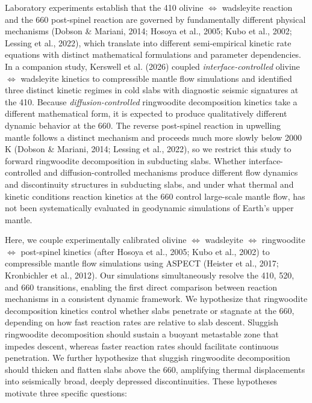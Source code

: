 \documentclass[draft,linenumbers]{agujournal2019}
\begin{document}
Laboratory experiments establish that the 410 olivine
\(\Leftrightarrow\) wadsleyite reaction and the 660 post-spinel reaction
are governed by fundamentally different physical mechanisms (Dobson \&
Mariani, 2014; Hosoya et al., 2005; Kubo et al., 2002; Lessing et al.,
2022), which translate into different semi-empirical kinetic rate
equations with distinct mathematical formulations and parameter
dependencies. In a companion study, Kerswell et al. (2026) coupled
\emph{interface-controlled} olivine \(\Leftrightarrow\) wadsleyite
kinetics to compressible mantle flow simulations and identified three
distinct kinetic regimes in cold slabs with diagnostic seismic
signatures at the 410. Because \emph{diffusion-controlled} ringwoodite
decomposition kinetics take a different mathematical form, it is
expected to produce qualitatively different dynamic behavior at the 660.
The reverse post-spinel reaction in upwelling mantle follows a distinct
mechanism and proceeds much more slowly below 2000 K (Dobson \& Mariani,
2014; Lessing et al., 2022), so we restrict this study to forward
ringwoodite decomposition in subducting slabs. Whether
interface-controlled and diffusion-controlled mechanisms produce
different flow dynamics and discontinuity structures in subducting
slabs, and under what thermal and kinetic conditions reaction kinetics
at the 660 control large-scale mantle flow, has not been systematically
evaluated in geodynamic simulations of Earth's upper mantle.

Here, we couple experimentally calibrated olivine \(\Leftrightarrow\)
wadsleyite \(\Leftrightarrow\) ringwoodite \(\Leftrightarrow\)
post-spinel kinetics (after Hosoya et al., 2005; Kubo et al., 2002) to
compressible mantle flow simulations using ASPECT (Heister et al., 2017;
Kronbichler et al., 2012). Our simulations simultaneously resolve the
410, 520, and 660 transitions, enabling the first direct comparison
between reaction mechanisms in a consistent dynamic framework. We
hypothesize that ringwoodite decomposition kinetics control whether
slabs penetrate or stagnate at the 660, depending on how fast reaction
rates are relative to slab descent. Sluggish ringwoodite decomposition
should sustain a buoyant metastable zone that impedes descent, whereas
faster reaction rates should facilitate continuous penetration. We
further hypothesize that sluggish ringwoodite decomposition should
thicken and flatten slabs above the 660, amplifying thermal
displacements into seismically broad, deeply depressed discontinuities.
These hypotheses motivate three specific questions:
\end{document}
